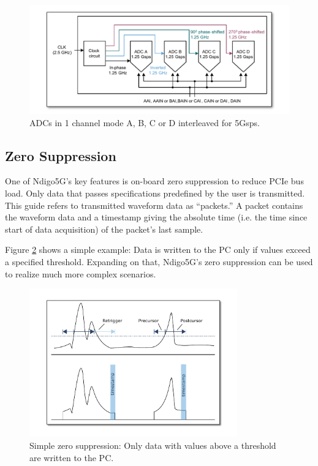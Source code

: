 \begin{figure}
    \centering
    \includegraphics[width=\textwidth]{figures/1ChannelMode.pdf}
    \caption{ADCs in 1 channel mode A, B, C or D interleaved for 5Gsps.\label{fig:1ChannelMode}}
\end{figure}

\clearpage
\subsection{Zero Suppression}

One of Ndigo5G's key features is on-board zero suppression to reduce PCIe bus load. Only data that passes specifications predefined by the user is transmitted. This guide refers to transmitted waveform data as ``packets.'' A packet contains the waveform data and a timestamp giving the absolute time (i.e. the time since start of data acquisition) of the packet's last sample.\par
Figure \ref{fig:ZeroSupp} shows a simple example: Data is written to the PC only if values exceed a specified threshold. Expanding on that, Ndigo5G's zero suppression can be used to realize much more complex scenarios.

\begin{figure}[hb]
    \centering
    \includegraphics[width=0.8\textwidth]{figures/ZeroSupp.pdf}
    \caption{Simple zero suppression: Only data with values above a threshold are written to the PC.\label{fig:ZeroSupp}}
\end{figure}

